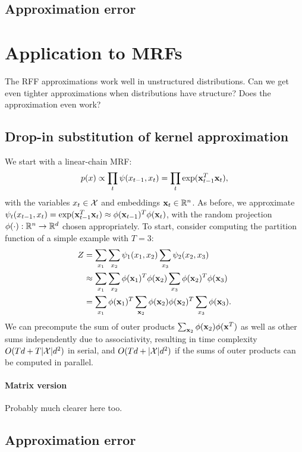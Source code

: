 \documentclass{article}
\begin{document}
\subsection{Approximation error}

\section{Application to MRFs}
The RFF approximations work well in unstructured distributions.
Can we get even tighter approximations when distributions have structure?
Does the approximation even work?

\subsection{Drop-in substitution of kernel approximation}
We start with a linear-chain MRF:
$$p(x) \propto \prod_t \psi(x_{t-1},x_t) = \prod_t \exp(\mathbf{x}_{t-1}^T\mathbf{x}_t),$$
with the variables $x_t\in\mathcal{X}$ and embeddings $\mathbf{x}_t\in\mathbb{R}^n$.
As before, we approximate $\psi_t(x_{t-1}, x_t) = \exp(\mathbf{x}_{t-1}^T \mathbf{x}_t) \approx \phi(\mathbf{x}_{t-1})^T\phi(\mathbf{x}_t)$,
with the random projection $\phi(\cdot): \mathbb{R}^n \to \mathbb{R}^d$ chosen appropriately.
To start, consider computing the partition function of a simple example with $T=3$:
\begin{equation}
\begin{aligned}
Z
&= \sum_{x_1}\sum_{x_2} \psi_1(x_1, x_2) \sum_{x_3} \psi_2(x_2, x_3) \\
&\approx \sum_{x_1}\sum_{x_2} \phi(\mathbf{x}_1)^T\phi(\mathbf{x}_2) \sum_{x_3} \phi(\mathbf{x}_2)^T\phi(\mathbf{x}_3)\\
&= \sum_{x_1} \phi(\mathbf{x}_1)^T \sum_{\mathbf{x}_2} \phi(\mathbf{x}_2)\phi(\mathbf{x}_2)^T \sum_{x_3}\phi(\mathbf{x}_3).
\end{aligned}
\end{equation}
We can precompute the sum of outer products $\sum_{\mathbf{x}_2}\phi(\mathbf{x}_2)\phi(\mathbf{x}^T)$
as well as other sums independently due to associativity,
resulting in time complexity $O(Td + T|\mathcal{X}|d^2)$ in serial,
and $O(Td + |\mathcal{X}|d^2)$ if the sums of outer products can be computed in parallel.

\paragraph{Matrix version}
Probably much clearer here too.

\subsection{Approximation error}




\end{document}
